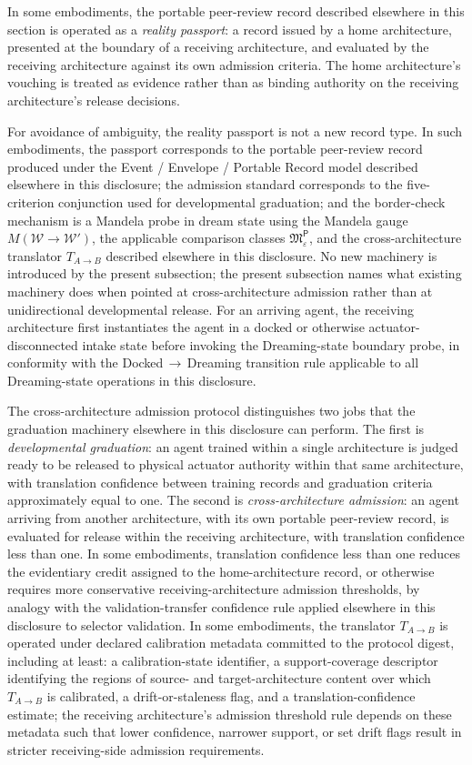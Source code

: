 \documentclass[a4paper,12pt]{article}
\begin{document}
In some embodiments, the portable peer-review record described
elsewhere in this section is operated as a \emph{reality passport}:
a record issued by a home architecture, presented at the boundary
of a receiving architecture, and evaluated by the receiving
architecture against its own admission criteria. The home
architecture's vouching is treated as evidence rather than as
binding authority on the receiving architecture's release decisions.

For avoidance of ambiguity, the reality passport is not a new
record type. In such embodiments, the passport corresponds to the
portable peer-review record produced under the Event / Envelope /
Portable Record model described elsewhere in this disclosure; the
admission standard corresponds to the five-criterion conjunction
used for developmental graduation; and the border-check mechanism
is a Mandela probe in dream state using the Mandela gauge
$M(\mathcal{W}\!\to\!\mathcal{W}')$, the applicable comparison
classes $\mathfrak{M}^{\mathsf{P}}_{\varepsilon}$, and the
cross-architecture translator $T_{A\to B}$ described elsewhere in
this disclosure. No new machinery is introduced by the present
subsection; the present subsection names what existing machinery
does when pointed at cross-architecture admission rather than at
unidirectional developmental release. For an arriving agent, the
receiving architecture first instantiates the agent in a docked or
otherwise actuator-disconnected intake state before invoking the
Dreaming-state boundary probe, in conformity with the
Docked\,$\to$\,Dreaming transition rule applicable to all
Dreaming-state operations in this disclosure.

The cross-architecture admission protocol distinguishes two jobs
that the graduation machinery elsewhere in this disclosure can
perform. The first is \emph{developmental graduation}: an agent
trained within a single architecture is judged ready to be released
to physical actuator authority within that same architecture, with
translation confidence between training records and graduation
criteria approximately equal to one. The second is
\emph{cross-architecture admission}: an agent arriving from another
architecture, with its own portable peer-review record, is
evaluated for release within the receiving architecture, with
translation confidence less than one. In some embodiments,
translation confidence less than one reduces the evidentiary credit
assigned to the home-architecture record, or otherwise requires
more conservative receiving-architecture admission thresholds, by
analogy with the validation-transfer confidence rule applied
elsewhere in this disclosure to selector validation. In some
embodiments, the translator $T_{A\to B}$ is operated under
declared calibration metadata committed to the protocol digest,
including at least: a calibration-state identifier, a
support-coverage descriptor identifying the regions of source-
and target-architecture content over which $T_{A\to B}$ is
calibrated, a drift-or-staleness flag, and a translation-confidence
estimate; the receiving architecture's admission threshold rule
depends on these metadata such that lower confidence, narrower
support, or set drift flags result in stricter receiving-side
admission requirements.
\end{document}
